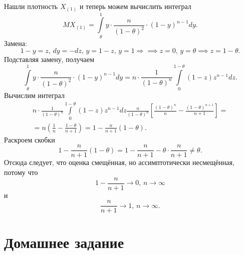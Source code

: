 Нашли плотность $X_{ \left( 1 \right) }$ и теперь можем вычислить интеграл
$$MX_{ \left( 1 \right) } =
  \int \limits_{ \theta }^1
    y \cdot \frac{n}{ \left( 1 - \theta \right)^2} \cdot \left( 1 - y \right)^{n - 1}
  dy.$$
Замена:
$$1 - y = z, \,
  dy = -dz, \,
  y = 1 - z, \,
  y = 1 \Rightarrow \implies z = 0, \,
  y = \theta \implies z = 1 - \theta.$$
Подставляя замену, получаем
$$ \int \limits_{ \theta }^1
    y \cdot \frac{n}{ \left( 1 - \theta \right)^2} \cdot \left( 1 - y \right)^{n - 1}
  dy =
  n \cdot \frac{1}{ \left( 1 - \theta \right)^n}
  \int \limits_0^{1 - \theta } \left( 1 - z \right) z^{n - 1} dz.$$
Вычислим интеграл
\begin{equation*}
  \begin{split}
    n \cdot \frac{1}{ \left( 1 - \theta \right)^n}
    \int \limits_0^{1 - \theta } \left( 1 - z \right) z^{n - 1} dz
    \frac{n}{ \left( 1 - \theta \right)^n}
    \left[
      \frac{ \left( 1 - \theta \right)^n}{n} - \frac{ \left( 1 - \theta \right)^{n+1}}{n + 1}
    \right] = \\
    = n \left( \frac{1}{n} - \frac{1 - \theta }{n + 1} \right) =
    1 - \frac{n}{n + 1} \left( 1 - \theta \right).
  \end{split}
\end{equation*}
Раскроем скобки
$$1 - \frac{n}{n + 1} \left( 1 - \theta \right) =
  1 - \frac{n}{n + 1} - \theta \cdot \frac{n}{n + 1} \neq
  \theta.$$
Отсюда следует, что оценка смещённая, но ассимптотически несмещённая, потому что
$$1 - \frac{n}{n + 1} \to 0, \,
  n \to \infty $$
и
$$ \frac{n}{n + 1} \to 1, \,
  n \to \infty.$$

\section*{Домашнее задание}
